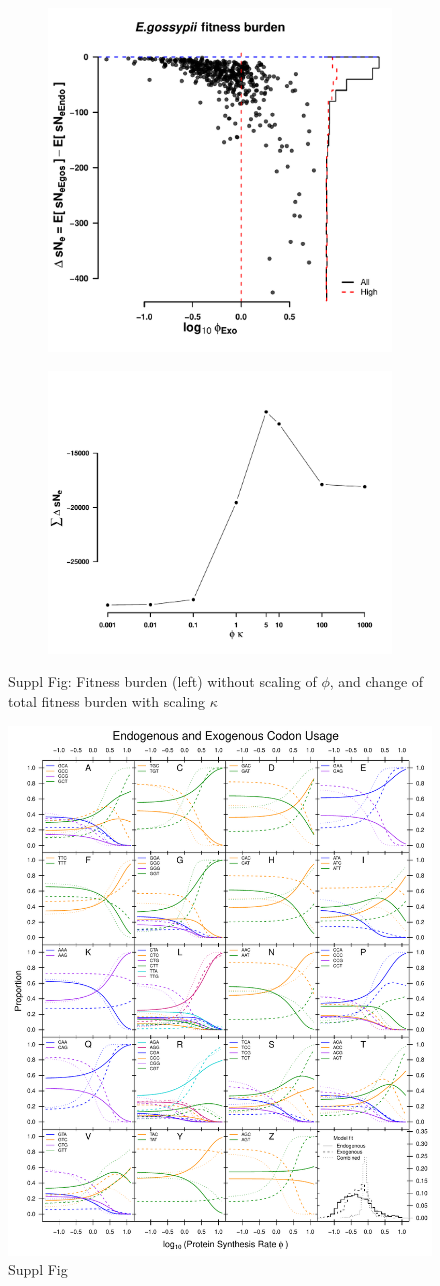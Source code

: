 \documentclass[12pt]{article}
\begin{document}
\begin{figure}[h]
    \centering
    \begin{subfigure}
        \centering
        \includegraphics[width=.45\textwidth]{img/fitness_difference_gos_kappa1.pdf}
    \end{subfigure}
    \begin{subfigure}
        \centering
        \includegraphics[width=.45\textwidth]{img/fitness_phi_scaling_gos.pdf}
    \end{subfigure}
    \caption{Suppl Fig: Fitness burden (left) without scaling of $\phi$, and change of total fitness burden with scaling $\kappa$}
    \label{fig:sne_scaling}
\end{figure}

\clearpage
\begin{figure}[H]
     \centering
	\includegraphics[width=\textwidth]{img/CUB_cleft_main.pdf}
	\caption{Suppl Fig}
	\label{fig:corr_all_species}
\end{figure}
\end{document}
